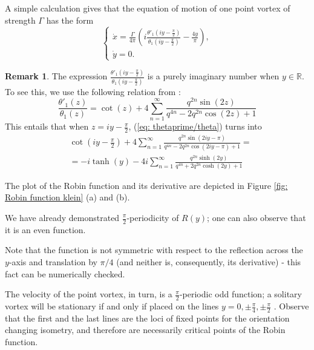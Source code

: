 \documentclass[11pt,twoside]{article}
\theoremstyle{definition}
\newtheorem{rem}[theorem]{Remark}
\numberwithin{equation}{section}
\begin{document}
A simple calculation gives that the equation of motion of one point vortex of strength $\Gamma$ has the form
\[
\begin{cases}
\dot{x} =  \frac{\Gamma}{4\pi}\left(i\frac{\theta'_1\left(iy - \frac{\pi}{2}\right)}{\theta_1\left(iy - \frac{\pi}{2}\right)} - \frac{4y}{\pi}\right),\\
\dot{y} = 0.
\end{cases}
\]
\begin{rem}
\label{st: remark purely imaginal}
 The expression $\frac{\theta'_1\left(iy - \frac{\pi}{2}\right)}{\theta_1\left(iy - \frac{\pi}{2}\right)}$ is a purely imaginary number when $y\in\mathbb{R}$.
To see this, we use the following relation from \cite{wolfram}:
 \begin{equation}
 \label{eq: thetaprime/theta}
 \frac{\theta'_1(z)}{\theta_1(z)} = \cot(z) + 4\sum_{n=1}^{\infty}\frac{q^{2n}\sin(2z)}{q^{4n} - 2q^{2n}\cos(2z) + 1}
 \end{equation}
 This entails that when $z = iy - \frac{\pi}{2}$, (\ref{eq: thetaprime/theta}) turns into
 \begin{equation*}
     \begin{split}
         &\cot\left(iy - \frac{\pi}{2}\right)+ 4\sum_{n=1}^{\infty}\frac{q^{2n}\sin(2iy - \pi)}{q^{4n} - 2q^{2n}\cos(2iy - \pi) + 1} = \\&=-i\tanh(y) - 4i\sum_{n=1}^{\infty}\frac{q^{2n}\sinh(2y)}{q^{4n} + 2q^{2n}\cosh(2y ) + 1}
     \end{split}
 \end{equation*}
\end{rem}
The plot of the Robin function  and its derivative are depicted in Figure \ref{fig: Robin function klein} (a) and (b). 

We have already demonstrated   $\frac{\pi}{2}$-periodicity of $R(y)$; one can also observe that it is an even function. 

Note that the function is not symmetric with respect to the reflection across the $y$-axis and translation by $\pi/4 $ (and neither is, consequently, its derivative) - this fact can be numerically checked. 

The velocity of the point vortex, in turn, is a $\frac{\pi}{2}$-periodic odd function; a solitary  vortex will be stationary if and only if placed on the lines $y = 0,\pm\frac{\pi}{4}, \pm\frac{\pi}{2}$ . Observe that the first and the last lines are the loci of fixed points for the orientation changing isometry, and therefore  are necessarily  critical points of the Robin function. 
\end{document}
